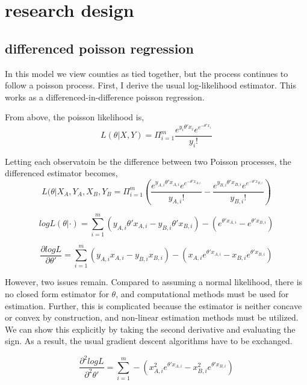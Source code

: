 \documentclass{article}
\begin{document}
\section{research design}

\subsection{differenced poisson regression}

In this model we view counties as tied together, but the process continues to follow a poisson process. First, I derive the usual log-likelihood estimator. This works as a differenced-in-difference poisson regression.

From above, the poisson likelihood is,
$$L(\theta|X,Y) = \Pi_{i=1}^{m}\frac{e^{y_{i}\theta'x_{i}}e^{e^{-\theta'x_{i}}}}{y_{i}!}$$

Letting each observatoin be the difference between two Poisson processes, the differenced estimator becomes,
$$L(\theta|X_{A},Y_{A},X_{B},Y_{B} = \Pi_{i=1}^{m}\left(\frac{e^{y_{A,i}\theta'x_{A,i}}e^{e^{-\theta'x_{A,i}}}}{y_{A,i}!}-\frac{e^{y_{B,i}\theta'x_{B,i}}e^{e^{-\theta'x_{B,i}}}}{y_{B,i}!}\right)$$

$$logL(\theta|\cdot) = \sum_{i=1}^{m}(y_{A,i}\theta'x_{A,i}-y_{B,i}\theta'x_{B,i})-(e^{\theta'x_{A,i}}-e^{\theta'x_{B,i}})$$

$$\frac{\partial logL}{\partial \theta'} = \sum_{i=1}^{m} (y_{A,i}x_{A,i} - y_{B,i}x_{B,i})-(x_{A,i}e^{\theta'x_{A,i}}-x_{B,i}e^{\theta'x_{B,i}})$$

However, two issues remain. Compared to assuming a normal likelihood, there is no closed form estimator for $\theta$, and computational methods must be used for estimation. Further, this is complicated because the estimator is neither concave or convex by construction, and non-linear estimation methods must be utilized. We can show this explicitly by taking the second derivative and evaluating the sign. As a result, the usual gradient descent algorithms have to be exchanged.

$$\frac{\partial^{2} logL}{\partial^{2} \theta'} = \sum_{i=1}^{m}-(x_{A,i}^{2}e^{\theta'x_{A,i}}-x_{B,i}^{2}e^{\theta'x_{B,i}})$$
\end{document}
